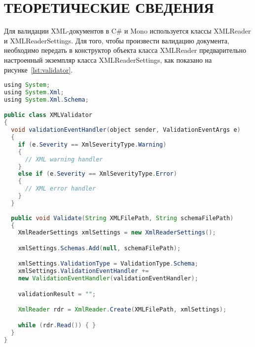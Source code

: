 \section{ТЕОРЕТИЧЕСКИЕ СВЕДЕНИЯ}
\label{sec:theory}

Для валидации XML-документов в C\# и Mono используется классы
XMLReader и XMLReaderSettings. 
Для того, чтобы произвести валидацию документа, необходимо 
передать в конструктор объекта класса XMLReader предварительно настроенный
экземпляр класса XMLReaderSettings, как показано на рисунке~\ref{lst:validator}.

\begin{lstlisting}[caption=Класс-валидатор XML-документов, 
label=lst:validator,language={Java},basicstyle=\scriptsize\ttfamily]
using System;
using System.Xml;
using System.Xml.Schema;

public class XMLValidator
{ 
  void validationEventHandler(object sender, ValidationEventArgs e)
  {
    if (e.Severity == XmlSeverityType.Warning)
    {
      // XML warning handler 
    }
    else if (e.Severity == XmlSeverityType.Error)
    {
      // XML error handler
    }
  }  
  
  public void Validate(String XMLFilePath, String schemaFilePath)
  {
    XmlReaderSettings xmlSettings = new XmlReaderSettings();

    xmlSettings.Schemas.Add(null, schemaFilePath);

    xmlSettings.ValidationType = ValidationType.Schema;
    xmlSettings.ValidationEventHandler +=
    new ValidationEventHandler(validationEventHandler);

    validationResult = "";

    XmlReader rdr = XmlReader.Create(XMLFilePath, xmlSettings);

    while (rdr.Read()) { }
  }
}
\end{lstlisting}
